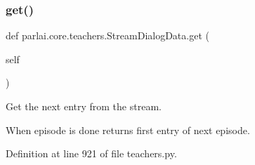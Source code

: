 \subsubsection{\texorpdfstring{get()}{get()}}
{\footnotesize\ttfamily def parlai.\+core.\+teachers.\+Stream\+Dialog\+Data.\+get (\begin{DoxyParamCaption}\item[{}]{self }\end{DoxyParamCaption})}

\begin{DoxyVerb}Get the next entry from the stream.

When episode is done returns first entry of next episode.
\end{DoxyVerb}
 

Definition at line 921 of file teachers.\+py.


